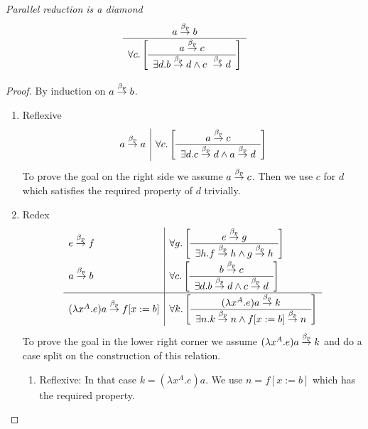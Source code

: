 \begin{theorem}
    \label{ParallelReductionDiamond}
    \emph{Parallel reduction is a diamond}
    $$
    \ruleh{
        a \preduce b
    }
    {
        \forall c.
        \left[
        \ruleh{a \preduce c}{\exists d. b \preduce d \land c \preduce d}
        \right]
    }
    $$

    \begin{proof} By induction on $a \stackrel{\beta_p}{\to} b$.

        \begin{enumerate}
        \item Reflexive
        $$
        \begin{array}{l|l}
            a \stackrel{\beta_p}{\to} a
            &
            \forall c.
            \left[
                \begin{array}{c} a \stackrel{\beta_p}{\to} c \\ \hline \exists d. c \stackrel{\beta_p}{\to} d \land a \stackrel{\beta_p}{\to} d\end{array}
            \right]
        \end{array}
        $$
        To prove the goal on the right side we assume $a \stackrel{\beta_p}{\to} c$. Then we use
        $c$ for $d$ which satisfies the required property of $d$ trivially.

        \item Redex
        $$
        \begin{array}{l|l}
            e \stackrel{\beta_p}{\to} f
            &
            \forall g.
            \left[
                \begin{array}{c} e \stackrel{\beta_p}{\to} g \\ \hline \exists h. f \stackrel{\beta_p}{\to} h \land g \stackrel{\beta_p}{\to} h\end{array}
            \right]
            \\
            a \stackrel{\beta_p}{\to} b
            &
            \forall c.
            \left[
                \begin{array}{c} b \stackrel{\beta_p}{\to} c \\ \hline \exists d. b \stackrel{\beta_p}{\to} d \land c \stackrel{\beta_p}{\to} d\end{array}
            \right]
            \\
            \hline
            (\lambda x^A. e) a \stackrel{\beta_p}{\to} f[x:=b]
            &
            \forall k.
            \left[
                \begin{array}{c} 
                    (\lambda x^A.e) a \stackrel{\beta_p}{\to} k
                 \\ \hline 
                    \exists n. k \stackrel{\beta_p}{\to} n \land f[x:=b] \stackrel{\beta_p}{\to} n
                \end{array}
            \right]
        \end{array}
        $$
        To prove the goal in the lower right corner we assume $(\lambda x^A.e)a
        \stackrel{\beta_p}{\to} k$ and do a case split on the construction of this relation.

            \begin{enumerate}
            \item Reflexive: In that case $k = (\lambda x^A. e) a$. We use $n =
            f[x:=b]$ which has the required property.



\end{enumerate}
\end{enumerate}
\end{proof}
\end{theorem}
